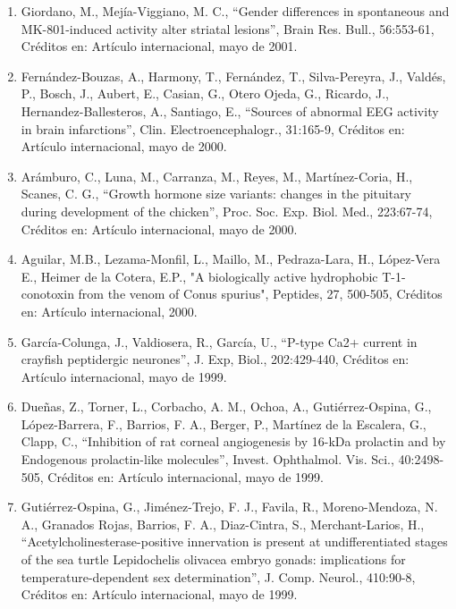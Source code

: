 \begin{enumerate}
\item Giordano, M., Mejía-Viggiano, M. C., “Gender differences in spontaneous and MK-801-induced activity alter striatal 
lesions”, Brain Res. Bull., 56:553-61, Créditos en: Artículo internacional, mayo de 2001.

\item Fernández-Bouzas, A., Harmony, T., Fernández, T., Silva-Pereyra, J., Valdés, P., Bosch, J., Aubert, E., Casian, G., 
Otero Ojeda, G., Ricardo, J., Hernandez-Ballesteros, A., Santiago, E., “Sources of abnormal EEG activity in brain 
infarctions”, Clin. Electroencephalogr., 31:165-9, Créditos en: Artículo internacional, mayo de 2000.

\item Arámburo, C., Luna, M., Carranza, M., Reyes, M., Martínez-Coria, H., Scanes, C. G., “Growth hormone size variants: 
changes in the pituitary during development of the chicken”, Proc. Soc. Exp. Biol. Med., 223:67-74, Créditos en: Artículo 
internacional, mayo de 2000.

\item Aguilar, M.B., Lezama-Monfil, L., Maillo, M., Pedraza-Lara, H., López-Vera E., Heimer de la Cotera, E.P., "A 
biologically active hydrophobic T-1-conotoxin from the venom of Conus spurius", Peptides, 27, 500-505, Créditos en: 
Artículo internacional, 2000.

\item García-Colunga, J., Valdiosera, R., García, U., “P-type Ca2+ current in crayfish peptidergic neurones”, J. Exp, 
Biol., 
202:429-440, Créditos en: Artículo internacional, mayo de 1999.

\item Dueñas, Z., Torner, L., Corbacho, A. M., Ochoa, A., Gutiérrez-Ospina, G., López-Barrera, F., Barrios, F. A., Berger, 
P., Martínez de la Escalera, G., Clapp, C., “Inhibition of rat corneal angiogenesis by 16-kDa prolactin and by Endogenous 
prolactin-like molecules”, Invest. Ophthalmol. Vis. Sci., 40:2498-505, Créditos en: Artículo internacional, mayo de 1999.

\item Gutiérrez-Ospina, G., Jiménez-Trejo, F. J., Favila, R., Moreno-Mendoza, N. A., Granados Rojas, Barrios, F. A., 
Diaz-Cintra, S., Merchant-Larios, H., “Acetylcholinesterase-positive innervation is present at undifferentiated stages of 
the sea turtle Lepidochelis olivacea embryo gonads: implications for temperature-dependent sex determination”, J. Comp. 
Neurol., 410:90-8, Créditos en: Artículo internacional, mayo de 1999.


\end{enumerate}
